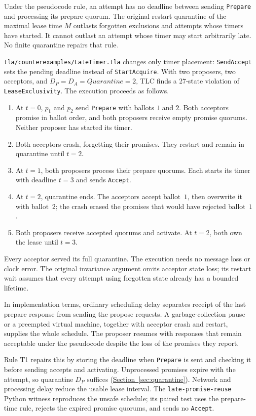 \documentclass[final,5p,times,twocolumn,number]{elsarticle}
\newcommand{\code}[1]{\texttt{#1}}
\newcommand{\secref}[1]{\hyperref[#1]{Section~\ref*{#1}}}
\begin{document}
Under the pseudocode rule, an attempt has no deadline between sending \code{Prepare} and processing its prepare quorum.  The original restart quarantine of the maximal lease time $M$ outlasts forgotten exclusions and attempts whose timers have started.  It cannot outlast an attempt whose timer may start arbitrarily late.  No finite quarantine repairs that rule.

\code{tla/counterexamples/LateTimer.tla} changes only timer placement: \code{SendAccept} sets the pending deadline instead of \code{StartAcquire}.  With two proposers, two acceptors, and $D_P = D_A = Quarantine = 2$, TLC finds a 27-state violation of \code{LeaseExclusivity}.  The execution proceeds as follows.

\begin{enumerate}
\itemsep0.15em
\item At $t=0$, $p_1$ and $p_2$ send \code{Prepare} with ballots $1$ and $2$.  Both acceptors promise in ballot order, and both proposers receive empty promise quorums.  Neither proposer has started its timer.
\item Both acceptors crash, forgetting their promises.  They restart and remain in quarantine until $t=2$.
\item At $t=1$, both proposers process their prepare quorums.  Each starts its timer with deadline $t=3$ and sends \code{Accept}.
\item At $t=2$, quarantine ends.  The acceptors accept ballot~$1$, then overwrite it with ballot~$2$; the crash erased the promises that would have rejected ballot~$1$.
\item Both proposers receive accepted quorums and activate.  At $t=2$, both own the lease until $t=3$.
\end{enumerate}

Every acceptor served its full quarantine.  The execution needs no message loss or clock error.  The original invariance argument omits acceptor state loss; its restart wait assumes that every attempt using forgotten state already has a bounded lifetime.

In implementation terms, ordinary scheduling delay separates receipt of the last prepare response from sending the propose requests.  A garbage-collection pause or a preempted virtual machine, together with acceptor crash and restart, supplies the whole schedule.  The proposer resumes with responses that remain acceptable under the pseudocode despite the loss of the promises they report.

Rule T1 repairs this by storing the deadline when \code{Prepare} is sent and checking it before sending accepts and activating.  Unprocessed promises expire with the attempt, so quarantine $D_P$ suffices (\secref{sec:quarantine}).  Network and processing delay reduce the usable lease interval.  The \code{late-promise-reuse} Python witness reproduces the unsafe schedule; its paired test uses the prepare-time rule, rejects the expired promise quorums, and sends no \code{Accept}.
\end{document}
